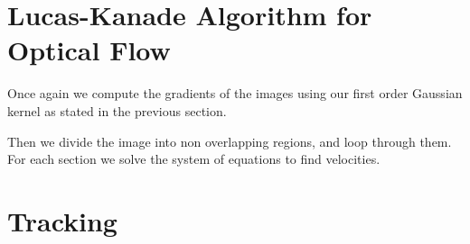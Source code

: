 \documentclass[11pt]{article}
\begin{document}
\section{Lucas-Kanade Algorithm for Optical Flow}
Once again we compute the gradients of the images using our first order Gaussian kernel as stated in the previous section. 

Then we divide the image into non overlapping regions, and loop through them. For each section we solve the system of equations to find velocities.




\section{Tracking}
\end{document}
